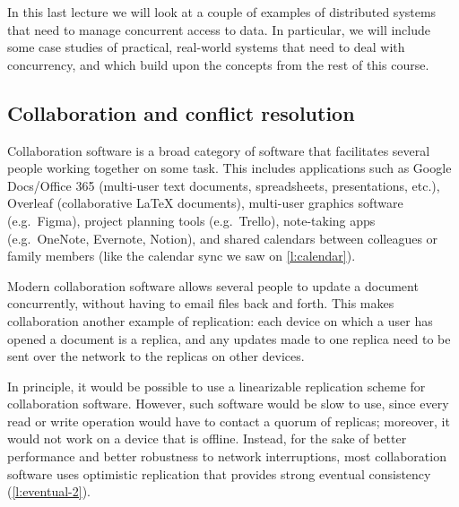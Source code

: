 In this last lecture we will look at a couple of examples of distributed systems that need to manage concurrent access to data.
In particular, we will include some case studies of practical, real-world systems that need to deal with concurrency, and which build upon the concepts from the rest of this course.

\subsection{Collaboration and conflict resolution}\label{sec:collaboration}

Collaboration software is a broad category of software that facilitates several people working together on some task.
This includes applications such as Google Docs/Office 365 (multi-user text documents, spreadsheets, presentations, etc.), Overleaf (collaborative {\LaTeX} documents), multi-user graphics software (e.g.\ Figma), project planning tools (e.g.\ Trello), note-taking apps (e.g.\ OneNote, Evernote, Notion), and shared calendars between colleagues or family members (like the calendar sync we saw on \autoref{l:calendar}).

Modern collaboration software allows several people to update a document concurrently, without having to email files back and forth.
This makes collaboration another example of replication: each device on which a user has opened a document is a replica, and any updates made to one replica need to be sent over the network to the replicas on other devices.

In principle, it would be possible to use a linearizable replication scheme for collaboration software.
However, such software would be slow to use, since every read or write operation would have to contact a quorum of replicas; moreover, it would not work on a device that is offline.
Instead, for the sake of better performance and better robustness to network interruptions, most collaboration software uses optimistic replication that provides strong eventual consistency (\autoref{l:eventual-2}).

